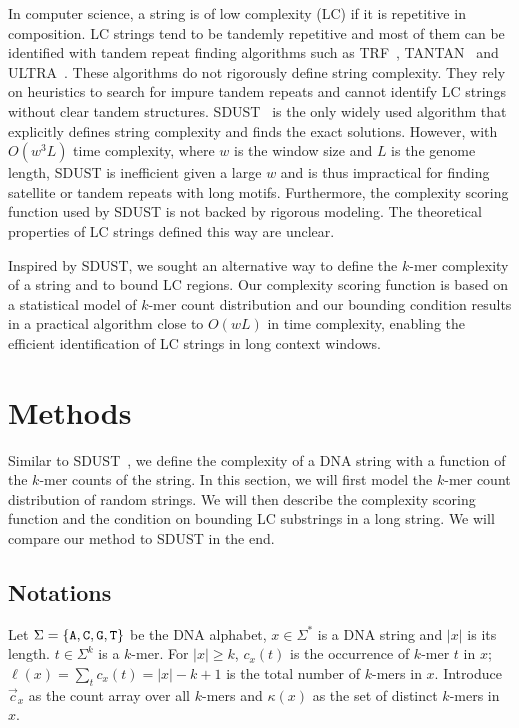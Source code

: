 \documentclass[webpdf,contemporary,large,namedate]{oup-authoring-template}%
\begin{document}
In computer science, a string is of low complexity (LC) if it is repetitive in composition.
LC strings tend to be tandemly repetitive and
most of them can be identified with tandem repeat finding algorithms such as
TRF~\citep{Benson:1999aa}, TANTAN~\citep{Frith:2011aa} and ULTRA~\citep{Olson:2024aa}.
These algorithms do not rigorously define string complexity.
They rely on heuristics to search for impure tandem repeats
and cannot identify LC strings without clear tandem structures.
SDUST~\citep{Morgulis:2006aa} is the only widely used algorithm that explicitly defines string complexity
and finds the exact solutions.
However, with $O(w^3L)$ time complexity, where $w$ is the window size and $L$ is the genome length,
SDUST is inefficient given a large $w$ and is thus impractical for finding satellite or tandem repeats with long motifs.
Furthermore, the complexity scoring function used by SDUST is not backed by rigorous modeling.
The theoretical properties of LC strings defined this way are unclear.

Inspired by SDUST, we sought an alternative way to define the $k$-mer complexity of a string
and to bound LC regions.
Our complexity scoring function is based on a statistical model of $k$-mer count distribution
and our bounding condition results in a practical algorithm close to $O(wL)$ in time complexity,
enabling the efficient identification of LC strings in long context windows.

\section{Methods}

Similar to SDUST~\citep{Morgulis:2006aa}, we define the complexity of a DNA string with a function of the $k$-mer counts of the string.
In this section, we will first model the $k$-mer count distribution of random strings.
We will then describe the complexity scoring function and the condition on bounding LC substrings in a long string.
We will compare our method to SDUST in the end.

\subsection{Notations}

Let $\Sigma=\{{\tt A},{\tt C},{\tt G},{\tt T}\}$ be the DNA alphabet,
$x\in\Sigma^*$ is a DNA string and $|x|$ is its length.
$t\in\Sigma^k$ is a $k$-mer.
For $|x|\ge k$, $c_x(t)$ is the occurrence of $k$-mer $t$ in $x$;
$\ell(x)=\sum_t c_x(t)=|x|-k+1$ is the total number of $k$-mers in $x$.
Introduce $\vec{c}_x$ as the count array over all $k$-mers
and $\kappa(x)$ as the set of distinct $k$-mers in $x$.
\end{document}
